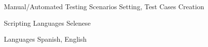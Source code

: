 


\begin{cvskills}


\cvskill
{Manual/Automated Testing} %
{Scenarios Setting, Test Cases Creation} %


\cvskill
{Scripting Languages} %
{Selenese} %


\cvskill
{Languages} %
{Spanish, English} %




\end{cvskills}


